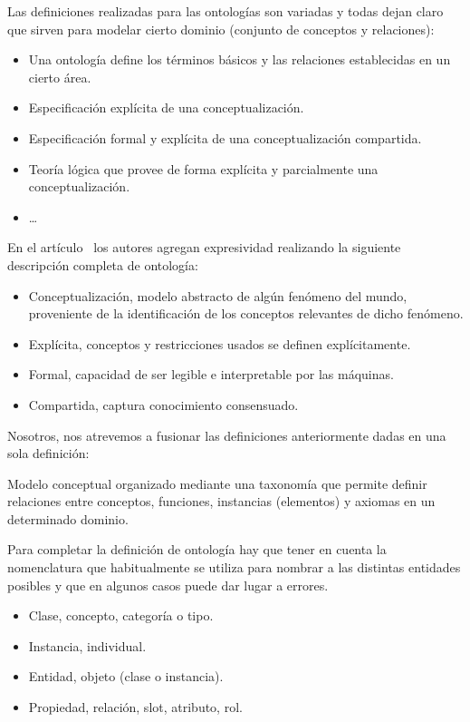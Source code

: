 Las definiciones realizadas para las ontologías son variadas y todas dejan claro
que sirven para modelar cierto dominio (conjunto de conceptos y relaciones):

\begin{itemize}
  \item Una ontología define los términos básicos y las relaciones establecidas
  en un cierto área.
  \item Especificación explícita de una conceptualización.
  \item Especificación formal y explícita de una conceptualización compartida.
  \item Teoría lógica que provee de forma explícita y parcialmente una conceptualización.
  \item \ldots
\end{itemize}

En el artículo~\cite{Studer98knowledge} los autores agregan
expresividad realizando la siguiente descripción completa de ontología:
\begin{itemize}
  \item Conceptualización, modelo abstracto de algún fenómeno del mundo,
  proveniente de la identificación de los conceptos relevantes de dicho
  fenómeno. \item Explícita, conceptos y restricciones usados se definen
  explícitamente. \item Formal, capacidad de ser legible e interpretable por las
  máquinas.
  \item Compartida, captura conocimiento consensuado.
\end{itemize}

Nosotros, nos atrevemos a fusionar las definiciones anteriormente dadas en una
sola definición:
\begin{definition}
Modelo conceptual organizado mediante una taxonomía que permite definir
relaciones entre conceptos, funciones, instancias (elementos) y axiomas en un determinado
dominio.
\end{definition}

Para completar la definición de ontología hay que tener en cuenta la
nomenclatura que habitualmente se utiliza para nombrar a las distintas entidades
posibles y que en algunos casos puede dar lugar a errores. 

\begin{itemize}
  \item Clase, concepto, categoría o tipo.
  \item Instancia, individual.
  \item Entidad, objeto (clase o instancia).
  \item Propiedad, relación, slot, atributo, rol.
\end{itemize}

